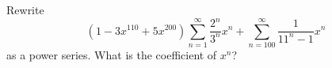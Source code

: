 Rewrite 
\[
(1 - 3x^{110} + 5x^{200}) \sum_{n = 1}^\infty \frac{2^n}{3^n}x^n
+ \sum_{n=100}^\infty \frac{1}{11^n - 1}x^n
\] as a
power series.
What is the coefficient of $x^n$?
